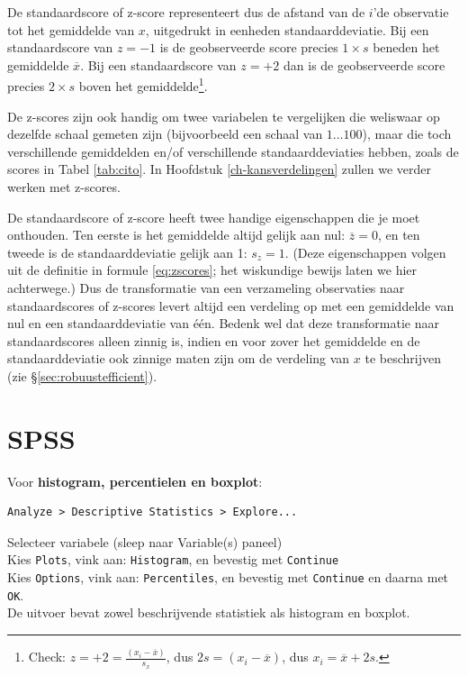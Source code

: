 \documentclass[
]{book}
\begin{document}
De standaardscore of z-score
representeert dus de afstand van de \(i\)'de observatie tot het gemiddelde
van \(x\), uitgedrukt in eenheden standaarddeviatie. Bij een
standaardscore van \(z=-1\) is de geobserveerde score precies \(1 \times s\)
beneden het gemiddelde \(\overline{x}\). Bij een standaardscore van \(z=+2\)
dan is de geobserveerde score precies \(2 \times s\) boven het
gemiddelde\footnote{Check: \(z = +2 = \frac{(x_i-\overline{x})}{s_x}\), dus \(2 s = (x_i-\overline{x})\), dus \(x_i = \overline{x}+2s\).}.

De z-scores zijn ook handig om twee variabelen te vergelijken die
weliswaar op dezelfde schaal gemeten zijn (bijvoorbeeld een schaal van
\(1 \dots 100\)), maar die toch verschillende gemiddelden en/of
verschillende standaarddeviaties hebben, zoals de scores in
Tabel \ref{tab:cito}.
In Hoofdstuk \ref{ch-kansverdelingen} zullen we verder werken met z-scores.

De standaardscore of z-score heeft twee handige eigenschappen die je
moet onthouden. Ten eerste is het gemiddelde altijd gelijk aan nul:
\(\overline{z}=0\), en ten tweede is de standaarddeviatie gelijk aan 1:
\(s_z = 1\). (Deze eigenschappen volgen uit de definitie in
formule \eqref{eq:zscores}; het wiskundige bewijs laten we hier
achterwege.) Dus de transformatie van een verzameling observaties naar
standaardscores of z-scores levert altijd een verdeling op met een
gemiddelde van nul en een standaarddeviatie van één. Bedenk wel dat deze
transformatie naar standaardscores alleen zinnig is, indien en voor
zover het gemiddelde en de standaarddeviatie ook zinnige maten zijn om
de verdeling van \(x\) te beschrijven (zie §\ref{sec:robuustefficient}).

\section{SPSS}\label{spss-3}

Voor \textbf{histogram, percentielen en boxplot}:

\begin{verbatim}
Analyze > Descriptive Statistics > Explore...
\end{verbatim}

Selecteer variabele (sleep naar Variable(s) paneel)\\
Kies \texttt{Plots}, vink aan: \texttt{Histogram}, en bevestig met \texttt{Continue}\\
Kies \texttt{Options}, vink aan: \texttt{Percentiles}, en bevestig met \texttt{Continue} en
daarna met \texttt{OK}.\\
De uitvoer bevat zowel beschrijvende statistiek als histogram en
boxplot.
\end{document}
